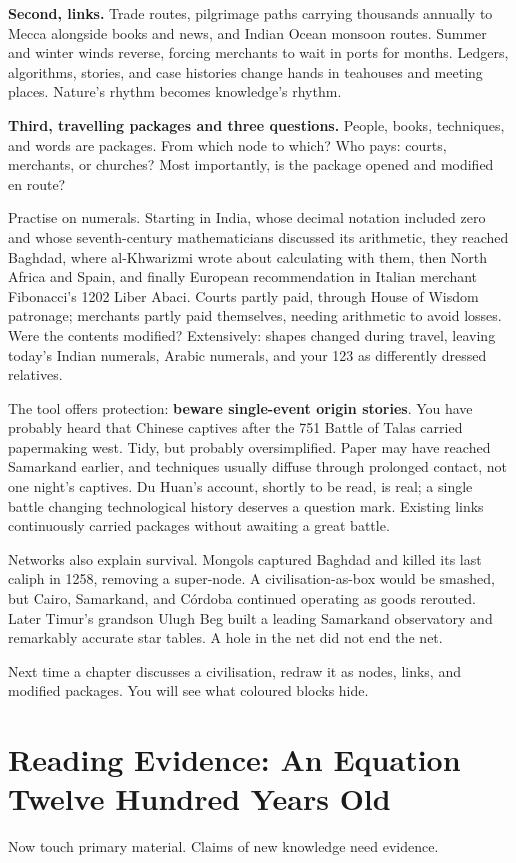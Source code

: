 \textbf{Second, links.} Trade routes, pilgrimage paths carrying thousands annually to Mecca alongside books and news, and Indian Ocean monsoon routes. Summer and winter winds reverse, forcing merchants to wait in ports for months. Ledgers, algorithms, stories, and case histories change hands in teahouses and meeting places. Nature's rhythm becomes knowledge's rhythm.

\textbf{Third, travelling packages and three questions.} People, books, techniques, and words are packages. From which node to which? Who pays: courts, merchants, or churches? Most importantly, is the package opened and modified en route?

Practise on numerals. Starting in India, whose decimal notation included zero and whose seventh-century mathematicians discussed its arithmetic, they reached Baghdad, where al-Khwarizmi wrote about calculating with them, then North Africa and Spain, and finally European recommendation in Italian merchant Fibonacci's 1202 Liber Abaci. Courts partly paid, through House of Wisdom patronage; merchants partly paid themselves, needing arithmetic to avoid losses. Were the contents modified? Extensively: shapes changed during travel, leaving today's Indian numerals, Arabic numerals, and your 123 as differently dressed relatives.

The tool offers protection: \textbf{beware single-event origin stories}. You have probably heard that Chinese captives after the 751 Battle of Talas carried papermaking west. Tidy, but probably oversimplified. Paper may have reached Samarkand earlier, and techniques usually diffuse through prolonged contact, not one night's captives. Du Huan's account, shortly to be read, is real; a single battle changing technological history deserves a question mark. Existing links continuously carried packages without awaiting a great battle.

Networks also explain survival. Mongols captured Baghdad and killed its last caliph in 1258, removing a super-node. A civilisation-as-box would be smashed, but Cairo, Samarkand, and Córdoba continued operating as goods rerouted. Later Timur's grandson Ulugh Beg built a leading Samarkand observatory and remarkably accurate star tables. A hole in the net did not end the net.

Next time a chapter discusses a civilisation, redraw it as nodes, links, and modified packages. You will see what coloured blocks hide.

\section[Evidence: A Twelve-Hundred-Year-Old Equation]{Reading Evidence: An Equation Twelve Hundred Years Old}
Now touch primary material. Claims of new knowledge need evidence.

